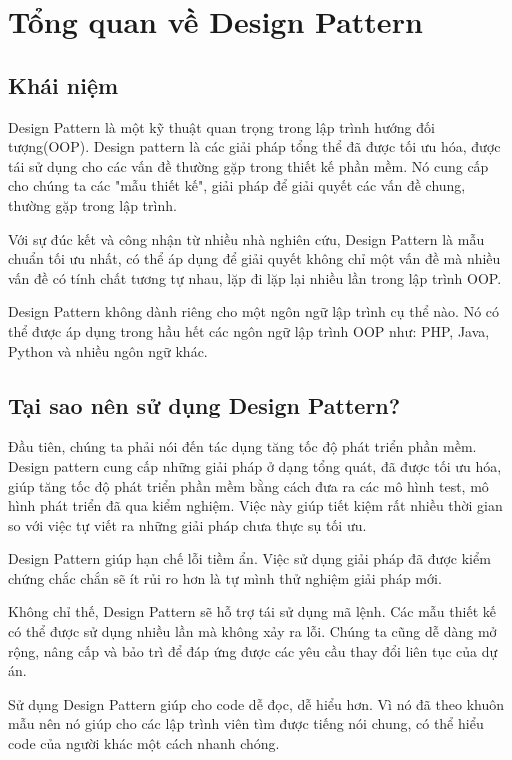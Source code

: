 \documentclass[14pt]{article}
\begin{document}

\cleardoublepage
\thispagestyle{empty}
\tableofcontents
\newpage
\section{Tổng quan về Design Pattern}
\subsection{Khái niệm}
Design Pattern là một kỹ thuật quan trọng trong lập trình hướng đối tượng(OOP). Design pattern là các giải pháp tổng thể đã được tối ưu hóa, được tái sử dụng cho các vấn đề thường gặp trong thiết kế phần mềm. Nó cung cấp cho chúng ta các "mẫu thiết kế", giải pháp để giải quyết các vấn đề chung, thường gặp trong lập trình.

Với sự đúc kết và công nhận từ nhiều nhà nghiên cứu, Design Pattern là mẫu chuẩn tối ưu nhất, có thể áp dụng để giải quyết không chỉ một vấn đề mà nhiều vấn đề có tính chất tương tự nhau, lặp đi lặp lại nhiều lần trong lập trình OOP.

Design Pattern không dành riêng cho một ngôn ngữ lập trình cụ thể nào. Nó có thể được áp dụng trong hầu hết các ngôn ngữ lập trình OOP như: PHP, Java, Python và nhiều ngôn ngữ khác.

\subsection{Tại sao nên sử dụng Design Pattern?}
Đầu tiên, chúng ta phải nói đến tác dụng tăng tốc độ phát triển phần mềm. Design pattern cung cấp những giải pháp ở dạng tổng quát, đã được tối ưu hóa, giúp tăng tốc độ phát triển phần mềm bằng cách đưa ra các mô hình test, mô hình phát triển đã qua kiểm nghiệm. Việc này giúp tiết kiệm rất nhiều thời gian so với việc tự viết ra những giải  pháp chưa thực sụ tối ưu.

Design Pattern giúp hạn chế lỗi tiềm ẩn. Việc sử dụng giải pháp đã được kiểm chứng chắc chắn sẽ ít rủi ro hơn là tự mình thử nghiệm giải pháp mới.

Không chỉ thế, Design Pattern sẽ hỗ trợ tái sử dụng mã lệnh. Các mẫu thiết kế có thể được sử dụng nhiều lần mà không xảy ra lỗi. Chúng ta cũng dễ dàng mở rộng, nâng cấp và bảo trì để đáp ứng được các yêu cầu thay đổi liên tục của dự án.

Sử dụng Design Pattern giúp cho code dễ đọc, dễ hiểu hơn. Vì nó đã theo khuôn mẫu nên nó giúp cho các lập trình viên tìm được tiếng nói chung, có thể hiểu code của người khác một cách nhanh chóng.
\end{document}
